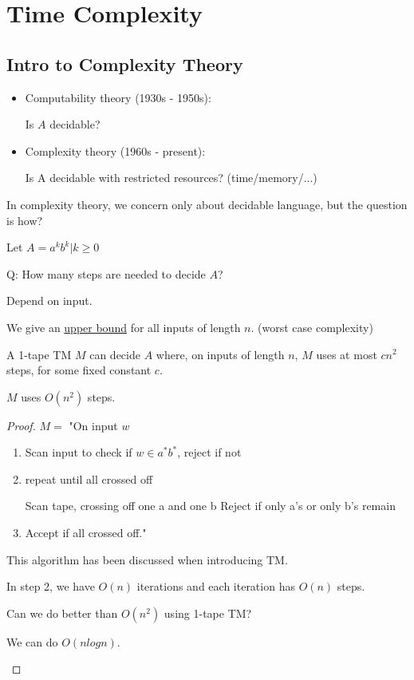 \chapter{Time Complexity}

\section{Intro to Complexity Theory}
\begin{itemize}
    \item Computability theory (1930s - 1950s):

    Is \(A\) decidable?

    \item Complexity theory (1960s - present):
    
    Is A decidable with restricted resources? (time/memory/...)
\end{itemize}

In complexity theory, we concern only about decidable language, but the question is how?

\begin{example}
    Let \(A = {a^kb^k | k \geq 0}\) 

    Q: How many steps are needed to decide \(A\)?

    Depend on input.  

    We give an \underline{upper bound} for all inputs of length \(n\). (worst case complexity)
\end{example}

\begin{theorem}
    A 1-tape TM \(M\) can decide \(A\) where, on inputs of length \(n\), \(M\) uses at most \(cn^2\) steps, for some fixed constant \(c\).      
    \begin{remark}[Terminology]
       \(M\) uses \(O(n^2)\) steps.   
    \end{remark}
\end{theorem}
\begin{proof}
    \(M = \) "On input \(w\)
    \begin{enumerate}
        \item Scan input to check if \(w \in a^*b^*\), reject if not
        \item repeat until all crossed off

        Scan tape, crossing off one a and one b
        Reject if only a's or only b's remain
        \item Accept if all crossed off."
    \end{enumerate}  
    \begin{note}
        This algorithm has been discussed when introducing TM.
    \end{note}

    In step 2, we have \(O(n)\) iterations and each iteration has \(O(n)\) steps.  

    \begin{note}
        Can we do better than \(O(n^2)\) using 1-tape TM? 

        We can do \(O(n log n)\). 
    \end{note}
\end{proof}


